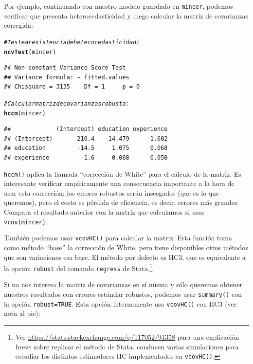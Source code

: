\documentclass{article}\usepackage[]{graphicx}\usepackage[]{color}
\makeatletter
\newcommand{\hlcom}[1]{\textcolor[rgb]{0.678,0.584,0.686}{\textit{#1}}}%
\newcommand{\hlstd}[1]{\textcolor[rgb]{0.345,0.345,0.345}{#1}}%
\newcommand{\hlkwd}[1]{\textcolor[rgb]{0.737,0.353,0.396}{\textbf{#1}}}%
\newenvironment{kframe}{%
 \def\at@end@of@kframe{}%
 \ifinner\ifhmode%
  \def\at@end@of@kframe{\end{minipage}}%
  \begin{minipage}{\columnwidth}%
 \fi\fi%
 \def\FrameCommand##1{\hskip\@totalleftmargin \hskip-\fboxsep
 \colorbox{shadecolor}{##1}\hskip-\fboxsep
     \hskip-\linewidth \hskip-\@totalleftmargin \hskip\columnwidth}%
 \MakeFramed {\advance\hsize-\width
   \@totalleftmargin\z@ \linewidth\hsize
   \@setminipage}}%
 {\par\unskip\endMakeFramed%
 \at@end@of@kframe}
\newenvironment{knitrout}{}{} %
\makeatother
\begin{document}
Por ejemplo, continuando con nuestro modelo guardado en \verb|mincer|, podemos verificar que presenta heterocedasticidad y luego calcular la matriz de covarianzas corregida:

\begin{knitrout}
\color{fgcolor}\begin{kframe}
\begin{alltt}
\hlcom{# Testear existencia de heterocedasticidad:}
\hlkwd{ncvTest}\hlstd{(mincer)}
\end{alltt}
\begin{verbatim}
## Non-constant Variance Score Test 
## Variance formula: ~ fitted.values 
## Chisquare = 3135    Df = 1     p = 0
\end{verbatim}
\begin{alltt}
\hlcom{# Calcular matriz de covarianzas robusta:}
\hlkwd{hccm}\hlstd{(mincer)}
\end{alltt}
\begin{verbatim}
##             (Intercept) education experience
## (Intercept)       210.4   -14.479     -1.602
## education         -14.5     1.075      0.068
## experience         -1.6     0.068      0.050
\end{verbatim}
\end{kframe}
\end{knitrout}

\verb|hccm()| aplica la llamada ``corrección de White'' para el cálculo de la matriz. 
Es interesante verificar empíricamente una consecuencia importante a la hora de usar esta corrección: los errores robustos serán insesgados (que es lo que queremos), pero el costo es pérdida de eficiencia, es decir, errores más grandes. Compara el resultado anterior con la matriz que calculamos al usar \verb|vcov(mincer)|.

También podemos usar \verb|vcovHC()| para calcular la matriz. Esta función toma como método ``base'' la corrección de White, pero tiene disponibles otros métodos que son variaciones esa base. El método por defecto es HC3, que es equivalente a la opción \verb|robust| del comando \verb|regress| de Stata.\footnote{Ver \url{https://stats.stackexchange.com/q/117052/91358} para una explicación breve sobre replicar el método de Stata. \textcite{long_using_2000} conducen varias simulaciones para estudiar los distintos estimadores HC implementados en \texttt{vcovHC()}.}

Si no nos interesa la matriz de covarianzas en sí misma y sólo queremos obtener nuestros resultados con errores estándar robustos, podemos usar \verb|summary()| con la opción \verb|robust=TRUE|. Esta opción internamente usa \verb|vcovHC()| con HC3 (ver nota al pie):
\end{document}
